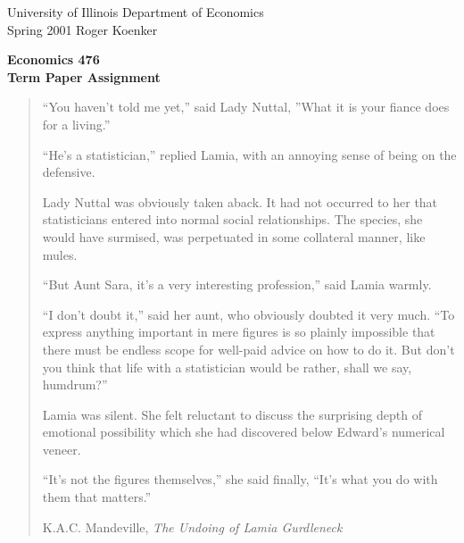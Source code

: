 \setlength{\textwidth}{170mm}
\setlength{\textheight}{220mm}
\setlength{\oddsidemargin}{0mm}
\setlength{\evensidemargin}{10mm}
\setlength{\topmargin}{-10mm}
\renewcommand{\baselinestretch}{1.2}
\newcommand{\REF}{\nopagebreak\noindent{\large{\bf
      References}}\vspace{.2in}}

\newcommand{\Ref}[1]{\medskip\noindent\hangafter=1
      \hangindent=20pt\ignorespaces #1}
\pagestyle{empty}



\noindent
University of Illinois \hfill Department of Economics \\
Spring 2001 \hfill Roger Koenker

\begin{center}
\large{
{\bf Economics 476 \\
Term Paper Assignment}}
\end{center}

\vspace{5mm}
\begin{quotation}

``You haven't told me yet,'' said Lady Nuttal, ''What it is your fiance does for a living.''

``He's a statistician,'' replied Lamia, with an annoying sense of being on the defensive.

Lady Nuttal was obviously taken aback.  It had not occurred to her that statisticians 
entered into normal social relationships.  The species, she would have surmised, was perpetuated in some collateral manner, like mules.

``But Aunt Sara, it's a very interesting profession,'' said Lamia warmly.

``I don't doubt it,'' said her aunt, who obviously doubted it very much.  ``To 
express anything important in mere figures is so plainly impossible 
that there must be endless scope for well-paid advice on how to do it.  But 
don't you think that life with a statistician would be rather, shall we say, humdrum?''

Lamia was silent.  She felt reluctant to discuss the surprising depth of 
emotional possibility which she had discovered below Edward's numerical veneer.

``It's not the figures themselves,'' she said finally, ``It's what you do with them that matters.''

\hspace{45mm} K.A.C. Mandeville, {\em The Undoing of Lamia Gurdleneck}

\end{quotation}

